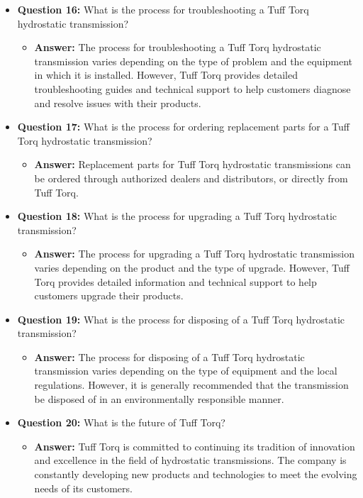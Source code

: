 \documentclass{article}
\begin{document}
\begin{itemize}
    \item \textbf{Question 16:} What is the process for troubleshooting a Tuff Torq hydrostatic transmission?
    \begin{itemize}
        \item \textbf{Answer:} The process for troubleshooting a Tuff Torq hydrostatic transmission varies depending on the type of problem and the equipment in which it is installed. However, Tuff Torq provides detailed troubleshooting guides and technical support to help customers diagnose and resolve issues with their products.
    \end{itemize}
    
    \item \textbf{Question 17:} What is the process for ordering replacement parts for a Tuff Torq hydrostatic transmission?
    \begin{itemize}
        \item \textbf{Answer:} Replacement parts for Tuff Torq hydrostatic transmissions can be ordered through authorized dealers and distributors, or directly from Tuff Torq.
    \end{itemize}
    
    \item \textbf{Question 18:} What is the process for upgrading a Tuff Torq hydrostatic transmission?
    \begin{itemize}
        \item \textbf{Answer:} The process for upgrading a Tuff Torq hydrostatic transmission varies depending on the product and the type of upgrade. However, Tuff Torq provides detailed information and technical support to help customers upgrade their products.
    \end{itemize}
    
    \item \textbf{Question 19:} What is the process for disposing of a Tuff Torq hydrostatic transmission?
    \begin{itemize}
        \item \textbf{Answer:} The process for disposing of a Tuff Torq hydrostatic transmission varies depending on the type of equipment and the local regulations. However, it is generally recommended that the transmission be disposed of in an environmentally responsible manner.
    \end{itemize}
    
    \item \textbf{Question 20:} What is the future of Tuff Torq?
    \begin{itemize}
        \item \textbf{Answer:} Tuff Torq is committed to continuing its tradition of innovation and excellence in the field of hydrostatic transmissions. The company is constantly developing new products and technologies to meet the evolving needs of its customers.
    \end{itemize}
\end{itemize}
\end{document}
